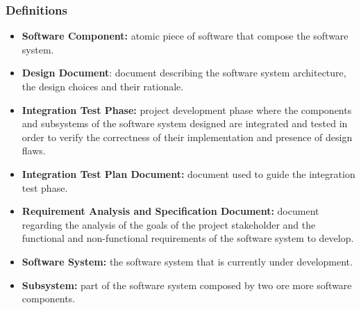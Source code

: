 \subsubsection{Definitions}

\begin{itemize}
	\item \textbf{Software Component:} atomic piece of software that compose the software system.
	\item \textbf{Design Document}: document describing the software system architecture, the design choices and their rationale.
	\item \textbf{Integration Test Phase:} project development phase where the components and subsystems of the software system designed are integrated and tested in order to verify the correctness of their implementation and presence of design flaws.
	\item \textbf{Integration Test Plan Document:} document used to guide the integration test phase.
	\item \textbf{Requirement Analysis and Specification Document:} document regarding the analysis of the goals of the project stakeholder and the functional and non-functional requirements of the software system to develop.
	\item \textbf{Software System:} the software system that is currently under development.
	\item \textbf{Subsystem:} part of the software system composed by two ore more software components.
\end{itemize}
